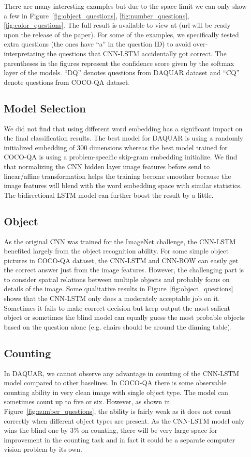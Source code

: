 \documentclass{article}
\renewcommand{\#}[1]{\textbf{#1}}
\begin{document}
There are many interesting examples but due to the space limit we can only show a few in Figure~\ref{fig:object_questions}, \ref{fig:number_questions}, \ref{fig:color_questions}. The full result is available to view at (url will be ready upon the release of the paper). For some of the examples, we specifically tested extra questions (the ones have ``a'' in the question ID) to avoid over-interpretating the questions that CNN-LSTM accidentally got correct. The parentheses in the figures represent the confidence score given by the softmax layer of the models. ``DQ'' denotes questions from DAQUAR dataset and ``CQ'' denote questions from COCO-QA dataset.

\subsection{Model Selection}
We did not find that using different word embedding has a significant impact on the final classification results. The best model for DAQUAR is using a randomly initialized embedding of 300 dimensions whereas the best model trained for COCO-QA is using a problem-specific skip-gram embedding initialize. We find that normalizing the CNN hidden layer image features before send to linear/affine transformation helps the training become smoother because the image features will blend with the word embedding space with similar statistics. The bidirectional LSTM model can further boost the result by a little.

\subsection{Object}
As the original CNN was trained for the ImageNet \cite{ilsvrc14} challenge, the CNN-LSTM benefited largely from the object recognition ability. For some simple object pictures in COCO-QA dataset, the CNN-LSTM and CNN-BOW can easily get the correct answer just from the image features. However, the challenging part is to consider spatial relations between multiple objects and probably focus on details of the image. Some qualitative results in Figure~\ref{fig:object_questions} shows that the CNN-LSTM only does a moderately acceptable job on it. Sometimes it fails to make correct decision but keep output the most salient object or sometimes the blind model can equally guess the most probable objects based on the question alone (e.g. chairs should be around the dinning table).

\subsection{Counting}
In DAQUAR, we cannot observe any advantage in counting of the CNN-LSTM model compared to other baselines. In COCO-QA there is some observable counting ability in very clean image with single object type. The model can sometimes count up to five or six. However, as shown in Figure~\ref{fig:number_questions}, the ability is fairly weak as it does not count correctly when different object types are present. As the CNN-LSTM model only wins the blind one by 3\% on counting, there will be very large space for improvement in the counting task and in fact it could be a separate computer vision problem by its own.
\end{document}
